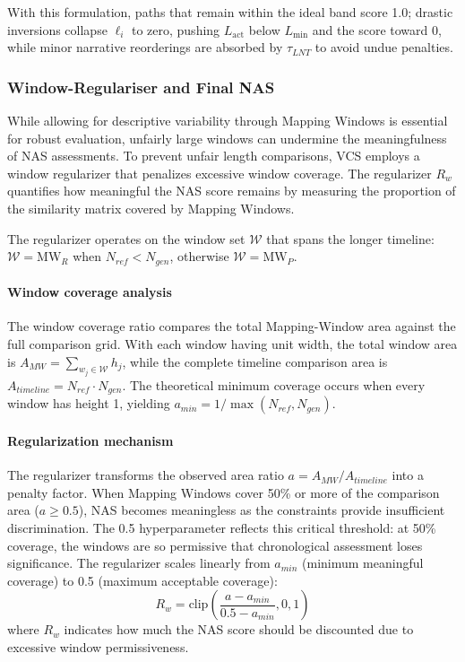 \documentclass[main.tex]{subfiles}
\begin{document}
With this formulation, paths that remain within the ideal band score 1.0; drastic inversions collapse $\ell_i$ to zero, pushing $L_{\text{act}}$ below $L_{\min}$ and the score toward 0, while minor narrative reorderings are absorbed by $\tau_{LNT}$ to avoid undue penalties.

\subsubsection{Window-Regulariser and Final NAS}
While allowing for descriptive variability through Mapping Windows is essential for robust evaluation, unfairly large windows can undermine the meaningfulness of NAS assessments. To prevent unfair length comparisons, VCS employs a window regularizer that penalizes excessive window coverage. The regularizer $R_w$ quantifies how meaningful the NAS score remains by measuring the proportion of the similarity matrix covered by Mapping Windows.

The regularizer operates on the window set $\mathcal{W}$ that spans the longer timeline: $\mathcal{W} = \text{MW}_{R}$ when $N_{ref} < N_{gen}$, otherwise $\mathcal{W} = \text{MW}_{P}$.

\paragraph{Window coverage analysis}
The window coverage ratio compares the total Mapping-Window area against the full comparison grid. With each window having unit width, the total window area is $A_{MW} = \sum_{w_j \in \mathcal{W}} h_j$, while the complete timeline comparison area is $A_{timeline} = N_{ref} \cdot N_{gen}$. The theoretical minimum coverage occurs when every window has height 1, yielding $a_{min} = 1/\max(N_{ref}, N_{gen})$.

\paragraph{Regularization mechanism}
The regularizer transforms the observed area ratio $a = A_{MW}/A_{timeline}$ into a penalty factor. When Mapping Windows cover 50\% or more of the comparison area ($a \geq 0.5$), NAS becomes meaningless as the constraints provide insufficient discrimination. The 0.5 hyperparameter reflects this critical threshold: at 50\% coverage, the windows are so permissive that chronological assessment loses significance. The regularizer scales linearly from $a_{min}$ (minimum meaningful coverage) to 0.5 (maximum acceptable coverage):
\begin{equation}
R_w = \text{clip}\left(\frac{a - a_{min}}{0.5 - a_{min}}, 0, 1\right)
\end{equation}
where $R_w$ indicates how much the NAS score should be discounted due to excessive window permissiveness.
\end{document}
